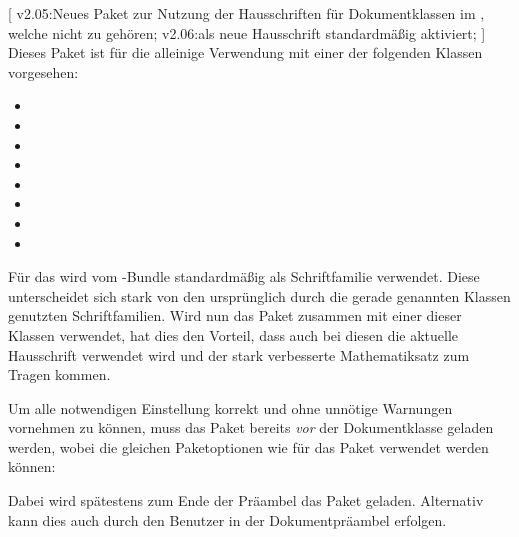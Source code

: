 \begin{DeclareEntity}{}
[
  v2.05:Neues Paket zur Nutzung der Hausschriften für Dokumentklassen im 
  \TUDCD, welche nicht zu \TUDScript gehören;
  v2.06:\OpenSans als neue Hausschrift standardmäßig aktiviert;
]
Dieses Paket ist für die alleinige Verwendung mit einer der folgenden Klassen 
vorgesehen:
\begin{itemize}
\item {}
\item {}
\item {}
\item {}
\item {}
\item {}
\item {}
\item {}
\end{itemize}
%
%
Für das \TUDCD wird vom \TUDScript-Bundle standardmäßig \OpenSans als 
Schriftfamilie verwendet. Diese unterscheidet sich stark von den ursprünglich 
durch die gerade genannten Klassen genutzten Schriftfamilien. Wird nun das 
Paket  zusammen mit einer dieser Klassen verwendet, 
hat dies den Vorteil, dass auch bei diesen die aktuelle Hausschrift verwendet 
wird und der stark verbesserte Mathematiksatz zum Tragen kommen.

Um alle notwendigen Einstellung korrekt und ohne unnötige Warnungen vornehmen 
zu können, muss das Paket  bereits \emph{vor} der 
Dokumentklasse geladen werden, wobei die gleichen Paketoptionen wie für das 
Paket  verwendet werden können:
%
%
Dabei wird spätestens zum Ende der Präambel das Paket  
geladen. Alternativ kann dies auch durch den Benutzer in der Dokumentpräambel 
erfolgen.
\end{DeclareEntity}
